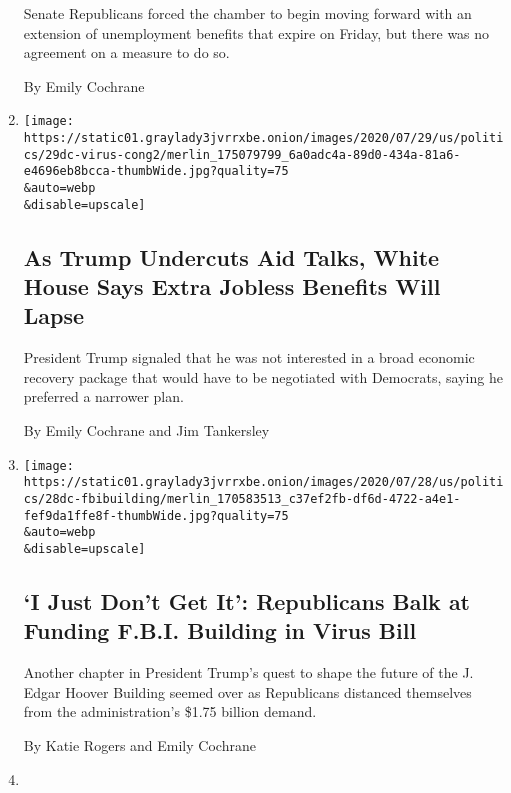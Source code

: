 \begin{enumerate}
  Senate Republicans forced the chamber to begin moving forward with an
  extension of unemployment benefits that expire on Friday, but there
  was no agreement on a measure to do so.

  By Emily Cochrane
\item
  \href{/2020/07/29/business/economy/virus-aid-trump.html}{}

  \texttt{[image: https://static01.graylady3jvrrxbe.onion/images/2020/07/29/us/politics/29dc-virus-cong2/merlin\_175079799\_6a0adc4a-89d0-434a-81a6-e4696eb8bcca-thumbWide.jpg?quality=75\\\&auto=webp\\\&disable=upscale]}

  \hypertarget{as-trump-undercuts-aid-talks-white-house-says-extra-jobless-benefits-will-lapse}{%
  \subsection{As Trump Undercuts Aid Talks, White House Says Extra
  Jobless Benefits Will
  Lapse}\label{as-trump-undercuts-aid-talks-white-house-says-extra-jobless-benefits-will-lapse}}

  President Trump signaled that he was not interested in a broad
  economic recovery package that would have to be negotiated with
  Democrats, saying he preferred a narrower plan.

  By Emily Cochrane and Jim Tankersley
\item
  \href{/2020/07/28/us/politics/republicans-trump-fbi-building-virus-relief-bill.html}{}

  \texttt{[image: https://static01.graylady3jvrrxbe.onion/images/2020/07/28/us/politics/28dc-fbibuilding/merlin\_170583513\_c37ef2fb-df6d-4722-a4e1-fef9da1ffe8f-thumbWide.jpg?quality=75\\\&auto=webp\\\&disable=upscale]}

  \hypertarget{i-just-dont-get-it-republicans-balk-at-funding-fbi-building-in-virus-bill}{%
  \subsection{`I Just Don't Get It': Republicans Balk at Funding F.B.I.
  Building in Virus
  Bill}\label{i-just-dont-get-it-republicans-balk-at-funding-fbi-building-in-virus-bill}}

  Another chapter in President Trump's quest to shape the future of the
  J. Edgar Hoover Building seemed over as Republicans distanced
  themselves from the administration's \$1.75 billion demand.

  By Katie Rogers and Emily Cochrane
\item
  \href{/2020/07/28/business/us-lawmakers-deliberate-over-another-aid-package.html}{}


\end{enumerate}
